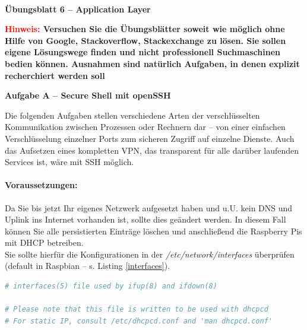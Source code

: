 \documentclass[paper=a4,fontsize=11pt]{scrartcl}%
\numberwithin{equation}{section}
\begin{document}
\begin{center}
~\\
\Large{\textbf{Übungsblatt 6 -- Application Layer}}
\end{center}
\large{\textbf{\textcolor{red}{Hinweis:} Versuchen Sie die Übungsblätter soweit wie möglich ohne Hilfe von Google, Stackoverflow, Stackexchange zu lösen. Sie sollen eigene Lösungswege finden und nicht professionell Suchmaschinen bedien können. Ausnahmen sind natürlich Aufgaben, in denen explizit recherchiert werden soll}

\begin{center}\Large{\textbf{Aufgabe A -- Secure Shell mit openSSH}}\end{center}\vskip0.25in
Die folgenden Aufgaben stellen verschiedene Arten der verschlüsselten Kommunikation zwischen Prozessen oder Rechnern dar -- von einer einfachen Verschlüsselung einzelner Ports zum sicheren Zugriff auf einzelne Dienste. Auch das Aufsetzen eines kompletten VPN, das transparent für alle darüber laufenden Services ist, wäre mit SSH möglich.\\
\paragraph{Voraussetzungen:}
Da Sie bis jetzt Ihr eigenes Netzwerk aufgesetzt haben und u.U. kein DNS und Uplink ins Internet vorhanden ist, sollte dies geändert werden. In diesem Fall können Sie alle persistierten Einträge löschen und anschließend die Raspberry Pis mit DHCP betreiben.\\
Sie sollte hierfür die Konfigurationen in der \emph{/etc/network/interfaces} überprüfen (default in Raspbian -- s. Listing \ref{interfaces}).
\begin{lstlisting}[style=Bash, language=Bash]
# interfaces(5) file used by ifup(8) and ifdown(8)

# Please note that this file is written to be used with dhcpcd
# For static IP, consult /etc/dhcpcd.conf and 'man dhcpcd.conf'


\end{lstlisting}}
\end{document}
